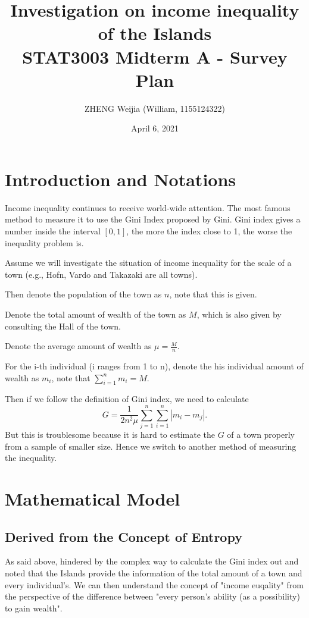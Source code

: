 \documentclass[12pt]{article}%
\begin{document}
\title{Investigation on income inequality of the Islands\\
\Large STAT3003 Midterm A - Survey Plan}
\author{ZHENG Weijia (William, 1155124322)}
\date{April 6, 2021}
\maketitle



\section{Introduction and Notations}
Income inequality continues to receive world-wide attention. The most famous method to measure it to use the Gini Index proposed by Gini. 
Gini index gives a number inside the interval $[0,1]$, the more the index close to 1, the worse the inequality problem is.

Assume we will investigate the situation of income inequality for the scale of a town (e.g., Hofn, Vardo and Takazaki are all towns).

Then denote the population of the town as $n$, note that this is given.

Denote the total amount of wealth of the town as $M$, which is also given by consulting the Hall of the town.

Denote the average amount of wealth as $\mu = \frac{M}{n}$.

For the i-th individual (i ranges from 1 to n), denote the his individual amount of wealth as $m_i$, note that $\sum_{i=1}^{n}m_i=M.$

Then if we follow the definition of Gini index, we need to calculate $$G=\frac{1}{2n^2\mu}\sum_{j=1}^{n}\sum_{i=1}^{n}|m_i-m_j|.$$
But this is troublesome because it is hard to estimate the $G$ of a town properly from a sample of smaller size. 
Hence we switch to another method of measuring the inequality.


\section{Mathematical Model}

\subsection{Derived from the Concept of Entropy}

As said above, hindered by the complex way to calculate the Gini index out and noted that the Islands provide the information of the total amount of a town and every individual's. 
We can then understand the concept of "income euqality" from the perspective of the difference between "every person's ability (as a possibility) to gain wealth".
\end{document}
